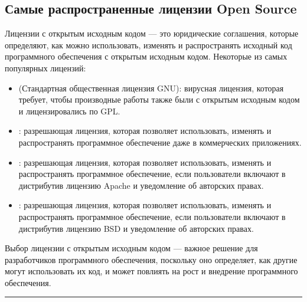 \documentclass[letterpaper,10pt,russian]{sphinxmanual}
\begin{document}
\subsection{Самые распространенные лицензии Open Source}
\label{\detokenize{educational_materials/open_license/content:id1}}
\sphinxAtStartPar
Лицензии с открытым исходным кодом — это юридические соглашения, которые определяют, как можно использовать, изменять и распространять исходный код программного обеспечения с открытым исходным кодом. Некоторые из самых популярных лицензий:
\begin{itemize}
\item {} 
\sphinxAtStartPar
{} (Стандартная общественная лицензия GNU): вирусная лицензия, которая требует, чтобы производные работы также были с открытым исходным кодом и лицензировались по GPL.

\item {} 
\sphinxAtStartPar
{}: разрешающая лицензия, которая позволяет использовать, изменять и распространять программное обеспечение даже в коммерческих приложениях.

\item {} 
\sphinxAtStartPar
{}: разрешающая лицензия, которая позволяет использовать, изменять и распространять программное обеспечение, если пользователи включают в дистрибутив лицензию Apache и уведомление об авторских правах.

\item {} 
\sphinxAtStartPar
{}: разрешающая лицензия, которая позволяет использовать, изменять и распространять программное обеспечение, если пользователи включают в дистрибутив лицензию BSD и уведомление об авторских правах.

\end{itemize}

\sphinxAtStartPar
Выбор лицензии с открытым исходным кодом — важное решение для разработчиков программного обеспечения, поскольку оно определяет, как другие могут использовать их код, и может повлиять на рост и внедрение программного обеспечения.


\bigskip\hrule\bigskip
\end{document}
